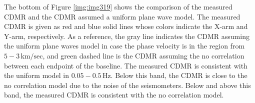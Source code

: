The bottom of Figure \ref{img:img319} shows the comparison of the measured CDMR and the CDMR assumed a uniform plane wave model. The measured CDMR is given as red and blue solid lines whose colors indicate the X-arm and Y-arm, respectively. As a reference, the gray line indicates the CDMR assuming the uniform plane waves model in case the phase velocity is in the region from $5 - 3\,\mathrm{km/sec}$, and green dashed line is the CDMR assuming the no correlation between each endpoint of the baseline. The measured CDMR is consistent with the uniform model in $0.05 - 0.5\,\mathrm{Hz}$. Below this band, the CDMR is close to the no correlation model due to the noise of the seismometers. Below and above this band, the measured CDMR is consistent with the no correlation model.


